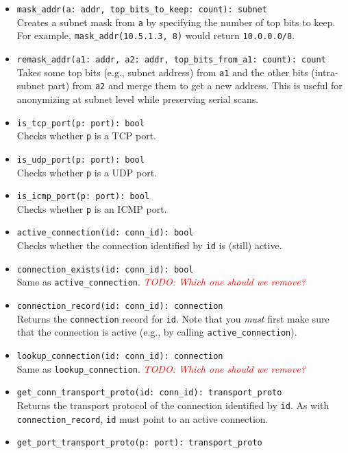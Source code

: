 \documentclass[10pt,landscape]{article}
\def\todo#1{\textit{\textcolor{red}{TODO: #1}}}
\begin{document}
\begin{multicols*}{2}
\begin{itemize}
  \item \verb|mask_addr(a: addr, top_bits_to_keep: count): subnet|\\
    Creates a subnet mask from \texttt{a} by specifying the number of top bits
    to keep. For example, \verb|mask_addr(10.5.1.3, 8)| would return
    \verb|10.0.0.0/8|.
  \item \verb|remask_addr(a1: addr, a2: addr, top_bits_from_a1: count): count|\\
    Takes some top bits (e.g., subnet address) from \texttt{a1} and the other
    bits (intra-subnet part) from \texttt{a2} and merge them to get a new
    address. This is useful for anonymizing at subnet level while preserving
    serial scans.
  \item \verb|is_tcp_port(p: port): bool|\\
    Checks whether \texttt{p} is a TCP port.
  \item \verb|is_udp_port(p: port): bool|\\
    Checks whether \texttt{p} is a UDP port.
  \item \verb|is_icmp_port(p: port): bool|\\
    Checks whether \texttt{p} is an ICMP port.
  \item \verb|active_connection(id: conn_id): bool|\\
    Checks whether the connection identified by \texttt{id} is (still) active.
  \item \verb|connection_exists(id: conn_id): bool|\\
    Same as \verb|active_connection|. \todo{Which one should we remove?}
  \item \verb|connection_record(id: conn_id): connection|\\
    Returns the \texttt{connection} record for \texttt{id}.
    Note that you \emph{must} first make sure that the connection is active
    (e.g., by calling \verb|active_connection|).
  \item \verb|lookup_connection(id: conn_id): connection|\\
    Same as \verb|lookup_connection|. \todo{Which one should we remove?}
  \item \verb|get_conn_transport_proto(id: conn_id): transport_proto|\\
    Returns the transport protocol of the connection identified by \texttt{id}.
    As with \verb|connection_record|, \texttt{id} must point to an active
    connection.
  \item \verb|get_port_transport_proto(p: port): transport_proto|\\

\end{itemize}
\end{multicols*}
\end{document}
